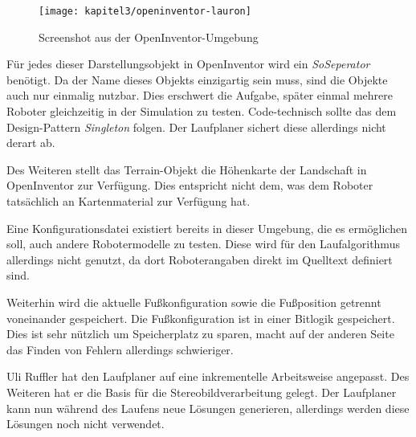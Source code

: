 \begin{figure}[t!]
  \centering
  \texttt{[image: kapitel3/openinventor-lauron]}
  \caption{Screenshot aus der OpenInventor-Umgebung}
  \label{Kap4:OpenInventorLauron}
\end{figure}

Für jedes dieser Darstellungsobjekt in OpenInventor wird ein \emph{SoSeperator} benötigt. Da der Name dieses Objekts einzigartig sein muss, sind die Objekte auch nur einmalig nutzbar. Dies erschwert die Aufgabe, später einmal mehrere Roboter gleichzeitig in der Simulation zu testen. Code-technisch sollte das dem Design-Pattern \emph{Singleton} folgen. Der Laufplaner sichert diese allerdings nicht derart ab.

Des Weiteren stellt das Terrain-Objekt die Höhenkarte der Landschaft in OpenInventor zur Verfügung. Dies entspricht nicht dem, was dem Roboter tatsächlich an Kartenmaterial zur Verfügung hat.

Eine Konfigurationsdatei existiert bereits in dieser Umgebung, die es ermöglichen soll, auch andere Robotermodelle zu testen. Diese wird für den Laufalgorithmus allerdings nicht genutzt, da dort Roboterangaben direkt im Quelltext definiert sind.

Weiterhin wird die aktuelle Fußkonfiguration sowie die Fußposition getrennt voneinander gespeichert. Die Fußkonfiguration ist in einer Bitlogik gespeichert. Dies ist sehr nützlich um Speicherplatz zu sparen, macht auf der anderen Seite das Finden von Fehlern allerdings schwieriger.

Uli Ruffler \autocite{ruffler2006} hat den Laufplaner auf eine inkrementelle Arbeitsweise angepasst. Des Weiteren hat er die Basis für die Stereobildverarbeitung gelegt. Der Laufplaner kann nun während des Laufens neue Lösungen generieren, allerdings werden diese Lösungen noch nicht verwendet.